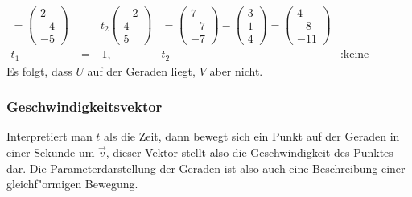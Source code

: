\begin{beispiel}
\begin{align*}
=
\begin{pmatrix}2\\-4\\-5 \end{pmatrix}
&
\qquad
t_2
\begin{pmatrix}-2\\4\\5\end{pmatrix}
&=
\begin{pmatrix}7\\-7\\-7\end{pmatrix}
-
\begin{pmatrix}3\\1\\4 \end{pmatrix}
=
\begin{pmatrix}4\\-8\\-11\end{pmatrix}
\\
t_1&=-1,&t_2&:\text{keine L"osung.}
\end{align*}
Es folgt, dass $U$ auf der Geraden liegt, $V$ aber nicht.
\end{beispiel}

\subsubsection{Geschwindigkeitsvektor}
Interpretiert man $t$ als die Zeit, dann bewegt sich ein Punkt auf der Geraden in
einer Sekunde um $\vec v$, dieser Vektor stellt also die Geschwindigkeit
des Punktes dar. Die Parameterdarstellung der Geraden ist also auch eine
Beschreibung einer gleichf"ormigen Bewegung.

